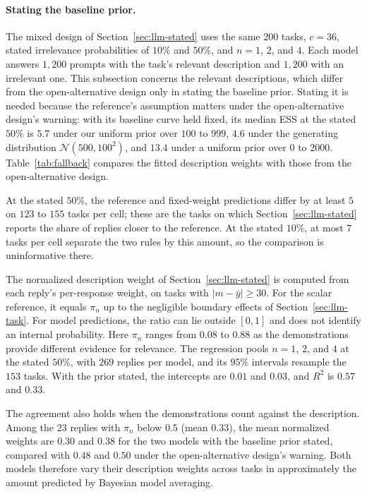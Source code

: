 \paragraph{Stating the baseline prior.}
The mixed design of Section~\ref{sec:llm-stated} uses the same $200$ tasks, $c=36$, stated irrelevance probabilities of $10\%$ and $50\%$, and $n=1$, $2$, and $4$. Each model answers $1{,}200$ prompts with the task's relevant description and $1{,}200$ with an irrelevant one. This subsection concerns the relevant descriptions, which differ from the open-alternative design only in stating the baseline prior. Stating it is needed because the reference's assumption matters under the open-alternative design's warning: with its baseline curve held fixed, its median ESS at the stated $50\%$ is $5.7$ under our uniform prior over $100$ to $999$, $4.6$ under the generating distribution $\mathcal{N}(500,100^2)$, and $13.4$ under a uniform prior over $0$ to $2000$. Table~\ref{tab:fallback} compares the fitted description weights with those from the open-alternative design.

At the stated $50\%$, the reference and fixed-weight predictions differ by at least $5$ on $123$ to $155$ tasks per cell; these are the tasks on which Section~\ref{sec:llm-stated} reports the share of replies closer to the reference. At the stated $10\%$, at most $7$ tasks per cell separate the two rules by this amount, so the comparison is uninformative there.

The normalized description weight of Section~\ref{sec:llm-stated} is computed from each reply's per-response weight, on tasks with $|m-\bar y|\geq30$. For the scalar reference, it equals $\pi_n$ up to the negligible boundary effects of Section~\ref{sec:llm-task}. For model predictions, the ratio can lie outside $[0,1]$ and does not identify an internal probability. Here $\pi_n$ ranges from $0.08$ to $0.88$ as the demonstrations provide different evidence for relevance. The regression pools $n=1$, $2$, and $4$ at the stated $50\%$, with $269$ replies per model, and its $95\%$ intervals resample the $153$ tasks. With the prior stated, the intercepts are $0.01$ and $0.03$, and $R^2$ is $0.57$ and $0.33$.

The agreement also holds when the demonstrations count against the description. Among the $23$ replies with $\pi_n$ below $0.5$ (mean $0.33$), the mean normalized weights are $0.30$ and $0.38$ for the two models with the baseline prior stated, compared with $0.48$ and $0.50$ under the open-alternative design's warning. Both models therefore vary their description weights across tasks in approximately the amount predicted by Bayesian model averaging.

